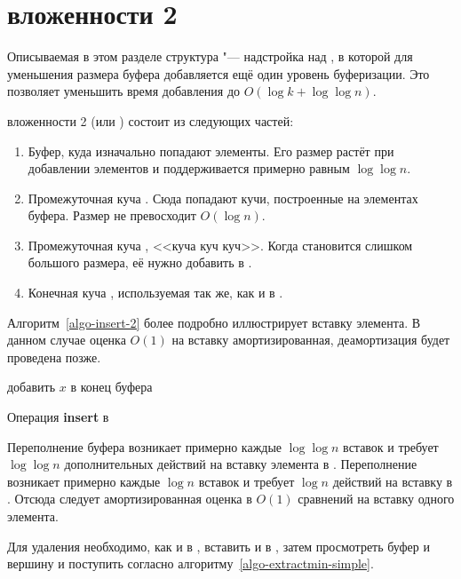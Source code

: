 \section{\CH вложенности 2}
Описываемая в этом разделе структура "--- надстройка над \SCH, в которой
для уменьшения размера буфера добавляется ещё один уровень буферизации.
Это позволяет уменьшить время добавления до $O(\log k + \log \log n)$.

\CH вложенности 2 (или \CH[2]) состоит из следующих частей:

\begin{enumerate}
\item Буфер, куда изначально попадают элементы. Его размер растёт при добавлении
    элементов и поддерживается примерно равным $\log \log n$.
\item Промежуточная куча \MH[1]. Сюда попадают кучи, построенные на элементах
    буфера. Размер \MH[1] не превосходит $O(\log n)$.
\item Промежуточная куча \MH[2], <<куча куч куч>>. Когда \MH[1] становится
    слишком большого размера, её нужно добавить в \MH[2].
\item Конечная куча \HH, используемая так же, как и в \SCH.
\end{enumerate}

Алгоритм~\ref{algo-insert-2} более подробно иллюстрирует вставку элемента.
В данном случае оценка $O(1)$ на вставку амортизированная, деамортизация будет
проведена позже.

\begin{algorithm}[h]
 добавить $x$ в конец буфера\;
 \caption{Операция \textbf{insert} в \CH[2]}
 \label{algo-insert-2}
\end{algorithm}

Переполнение буфера возникает примерно каждые $\log\log n$ вставок
и требует $\log \log n$ дополнительных действий на вставку элемента
в \MH[1]. Переполнение
\MH[1] возникает примерно каждые $\log n$ вставок и требует $\log n$
действий на вставку в \MH[2]. Отсюда следует амортизированная оценка
в $O(1)$ сравнений на вставку одного элемента.

Для удаления необходимо, как и в \SCH, вставить \MH[2] и \MH[1] в \HH,
затем просмотреть буфер и вершину \HH и поступить согласно
алгоритму~\ref{algo-extractmin-simple}.

